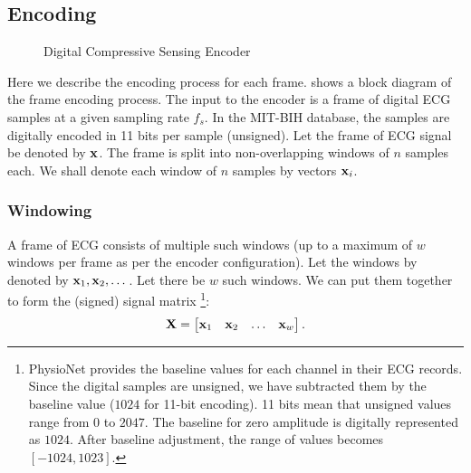


\subsection{Encoding}
\begin{figure*}[!ht]
\centering 

\caption{Digital Compressive Sensing Encoder}
\label{fig:cs:encoder}
\end{figure*}


\begin{figure}[!t]
 \removelatexerror
 \centering

\end{figure}

Here we describe the encoding process for each frame.
 shows a block diagram of the frame encoding process.
The input to the encoder is a frame of digital ECG samples
at a given sampling rate $f_s$. In the MIT-BIH database,
the samples are digitally encoded in 11 bits per sample (unsigned).
Let the frame of ECG signal be denoted by $\mathbf{x}$.
The frame is split into non-overlapping windows of $n$
samples each. We shall denote each window of $n$ samples
by vectors $\mathbf{x}_i$. 

\subsubsection{Windowing}
A frame of ECG consists of multiple
such windows (up to a maximum of $w$ windows per
frame as per the encoder configuration).
Let the windows by denoted by $\mathbf{x}_1, \mathbf{x}_2, \dots$.
Let there be $w$ such windows.
We can put them together to form the (signed) signal matrix
\footnote{
PhysioNet provides the baseline values for each channel
in their ECG records.
Since the digital samples are unsigned, we have subtracted
them by the baseline value ($1024$ for 11-bit encoding).
11 bits mean that unsigned values range from
$0$ to $2047$. The baseline for zero amplitude is
digitally represented as $1024$.
After baseline adjustment, the range of values becomes
$[-1024,1023]$.
}:
\begin{equation}
\mathbf{X} = \begin{bmatrix}
\mathbf{x}_1 & \mathbf{x}_2 & \dots & \mathbf{x}_w
\end{bmatrix}.
\end{equation}


